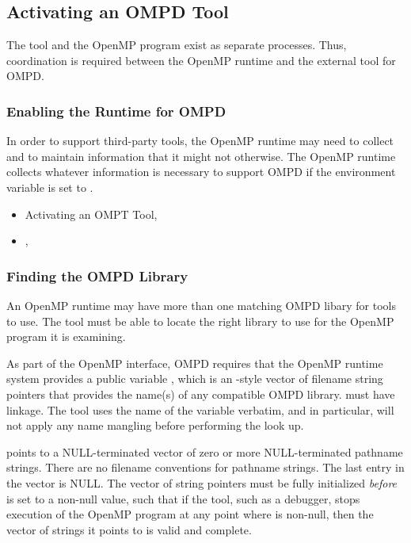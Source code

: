 \subsection{Activating an OMPD Tool}
\label{subsec:activating}

The tool and the OpenMP program exist as separate processes. 
Thus, coordination is required between the OpenMP runtime
and the external tool for OMPD.

\subsubsection{Enabling the Runtime for OMPD}
\label{subsubsec:enabling-ompd}

In order to support third-party tools, the OpenMP runtime may need to collect
and to maintain information that it might not otherwise. The OpenMP runtime 
collects whatever information is necessary to support OMPD if the environment 
variable  is set to .

\crossreferences
\begin{itemize}
\item Activating an OMPT Tool, 

\item   {}, 
\end{itemize}



\subsubsection{Finding the OMPD Library}
\label{subsubsec:finding-the-ompd}

An OpenMP runtime may have more than one matching OMPD libary for
tools to use.
The tool must be able to locate the right library to use
for the OpenMP program it is examining.

As part of the OpenMP interface, OMPD requires that the OpenMP
runtime system provides a public variable ,
which is an -style vector of filename string pointers that
provides the name(s) of any compatible OMPD library.
 must have  linkage.
The tool uses the name of the variable verbatim,
and in particular, will not apply any name mangling before
performing the look up.

 points to a NULL-terminated
vector of zero or more NULL-terminated pathname strings.
There are no filename conventions for pathname strings.
The last entry in the vector is NULL.
The vector of string pointers must be fully initialized \emph{before}
 is set to a non-null value,
such that if the tool, such as a debugger,
stops execution of the OpenMP program at any point where
 is non-null,
then the vector of strings it points to is valid and complete.

